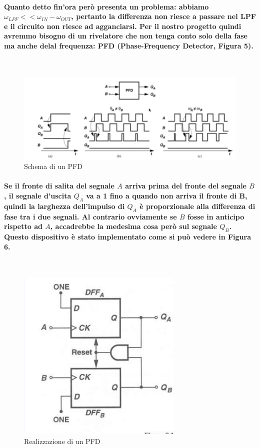 \documentclass{article}
\begin{document}
\paragraph{Quanto detto fin'ora però presenta un problema: abbiamo\\ $\omega_{LPF}<<\omega_{IN}-\omega_{OUT}$, pertanto la differenza non riesce a passare nel LPF e il circuito non riesce ad agganciarsi. Per il nostro progetto quindi avremmo bisogno di un rivelatore che non tenga conto solo della fase ma anche delal frequenza: PFD (Phase-Frequency Detector, Figura 5).}
~\begin{figure}[!h]%
\includegraphics[scale=0.4]{PFD2.png} 
\caption{Schema di un PFD}
\label{fig:foo}
\end{figure}
\paragraph{Se il fronte di salita del segnale $A$ arriva prima del fronte del segnale $B$, il segnale d'uscita $Q_A$ va a 1 fino a quando non arriva il fronte di B, quindi la larghezza dell'impulso di $Q_A$ è proporzionale alla differenza di fase tra i due segnali. Al contrario ovviamente se $B$ fosse in anticipo rispetto ad $A$, accadrebbe la medesima cosa però sul segnale $Q_B$.
Questo dispositivo è stato implementato come si può vedere in Figura 6.
}
~\begin{figure}[!h]%
\includegraphics[scale=0.8]{PFD.png} 
\caption{Realizzazione di un PFD}
\label{fig:foo}
\end{figure}
\end{document}

